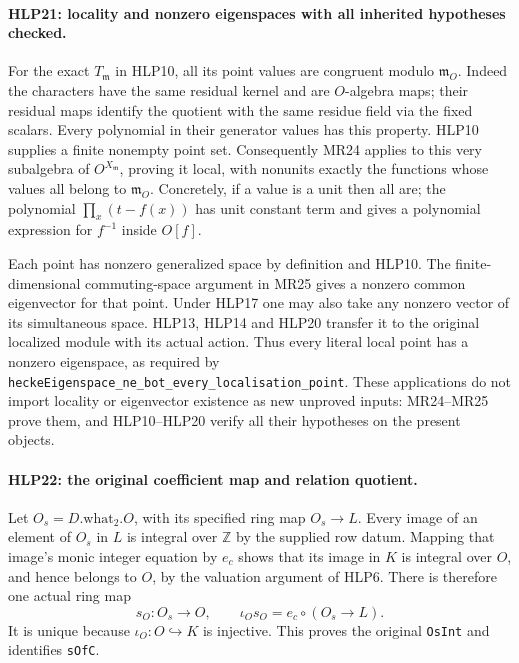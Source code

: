 \paragraph{HLP21: locality and nonzero eigenspaces with all inherited hypotheses checked.}
\label{claim:HLP21}
For the exact \(T_{\mathfrak m}\) in HLP10, all its point values
are congruent modulo \(\mathfrak m_O\). Indeed the characters
have the same residual kernel and are \(O\)-algebra maps; their
residual maps identify the quotient with the same residue field
via the fixed scalars. Every polynomial in their generator values
has this property. HLP10 supplies a finite nonempty point set.
Consequently MR24 applies to this very subalgebra of
\(O^{X_{\mathfrak m}}\), proving it local, with nonunits exactly
the functions whose values all belong to \(\mathfrak m_O\).
Concretely, if a value is a unit then all are; the polynomial
\(\prod_x(t-f(x))\) has unit constant term and gives a polynomial
expression for \(f^{-1}\) inside \(O[f]\).

Each point has nonzero generalized space by definition and HLP10.
The finite-dimensional commuting-space argument in MR25 gives
a nonzero common eigenvector for that point. Under HLP17 one may
also take any nonzero vector of its simultaneous space.
HLP13, HLP14 and HLP20 transfer it to the original localized
module with its actual action. Thus every literal local point has
a nonzero eigenspace, as required by
\texttt{hecke\allowbreak Eigenspace\_\allowbreak ne\_\allowbreak bot\_\allowbreak every\_\allowbreak localisation\_\allowbreak point}.
These applications do not import locality or eigenvector
existence as new unproved inputs: MR24--MR25 prove them, and
HLP10--HLP20 verify all their hypotheses on the present objects.

\paragraph{HLP22: the original coefficient map and relation quotient.}
\label{claim:HLP22}
Let \(O_s=D.\mathrm{what}_2.O\), with its specified ring map
\(O_s\to L\). Every image of an element of \(O_s\) in \(L\) is
integral over \(\mathbb Z\) by the supplied row datum. Mapping
that image's monic integer equation by \(e_c\) shows that its image in \(K\) is
integral over \(O\), and hence belongs to \(O\), by the valuation
argument of HLP6. There is therefore one actual ring map
\[
 s_O:O_s\longrightarrow O,\qquad
  \iota_Os_O=e_c\circ(O_s\to L).                    \tag{HLP.20}
\]
It is unique because \(\iota_O:O\hookrightarrow K\) is injective.
This proves the original \texttt{Os\allowbreak Int} and identifies
\texttt{s\allowbreak Of\allowbreak C}.


